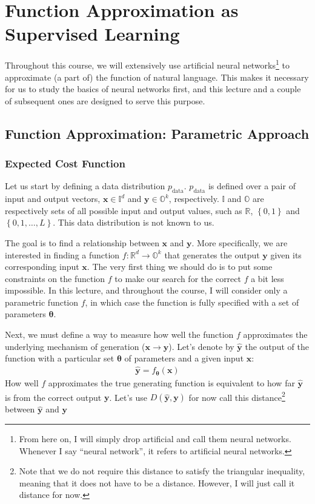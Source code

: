 \documentclass{report}
\newcommand{\vect}[1]{\mathbf{#1}}
\newcommand{\vects}[1]{\boldsymbol{#1}}
\newcommand{\vx}[0]{\vect{x}}
\newcommand{\vy}[0]{\vect{y}}
\newcommand{\TT}[0]{\vects{\theta}}
\newcommand{\RR}[0]{\mathbb{R}}
\newcommand{\OO}[0]{\mathbb{O}}
\newcommand{\II}[0]{\mathbb{I}}
\begin{document}
\chapter{Function Approximation as Supervised Learning}
\label{chap:function_approx}

Throughout this course, we will extensively use artificial neural
networks\footnote{
    From here on, I will simply drop artificial and call them neural networks.
    Whenever I say ``neural network'', it refers to artificial neural networks.
}
to approximate (a part of) the function of natural language. This makes it
necessary for us to study the basics of neural networks first, and this lecture
and a couple of subsequent ones are designed to serve this purpose.

\section{Function Approximation: Parametric Approach}

\subsection{Expected Cost Function}

Let us start by defining a data distribution $p_{\text{data}}$.
$p_{\text{data}}$ is defined over a pair of input and output vectors, $\vx \in
\II^d$ and $\vy \in \OO^k$, respectively. $\II$ and $\OO$ are respectively sets
of all possible input and output values, such as $\RR$, $\left\{ 0, 1\right\}$
and $\left\{0, 1, \ldots, L\right\}$. This data distribution is not known to us.

The goal is to find a relationship between $\vx$ and $\vy$. More specifically,
we are interested in finding a function $f:\RR^d \to \OO^k$ that generates the
output $\vy$ given its corresponding input $\vx$. The very first thing we should
do is to put some constraints on the function $f$ to make our search for the
correct $f$ a bit less impossible. In this lecture, and throughout the course, I
will consider only a parametric function $f$, in which case the function is
fully specified with a set of parameters $\TT$.

Next, we must define a way to measure how well the function $f$ approximates the
underlying mechanism of generation ($\vx \to \vy$). Let's denote by $\hat{\vy}$ the 
output of the function with a particular set $\TT$ of parameters and a given input
$\vx$:
\begin{align*}
    \hat{\vy} = f_{\TT}(\vx)
\end{align*}
How well $f$ approximates the true generating function is equivalent to how far
$\hat{\vy}$ is from the correct output $\vy$. Let's use $D(\hat{\vy}, \vy)$ for
now call this distance\footnote{
    Note that we do not require this distance to satisfy the triangular
    inequality, meaning that it does not have to be a distance. However, I will
    just call it distance for now.
}
between $\hat{\vy}$ and $\vy$
\end{document}
